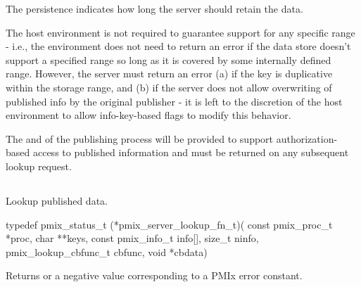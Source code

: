 The persistence indicates how long the server should retain the data.

\advicermstart
The host environment is not required to guarantee support for any specific range - i.e., the environment does not need to return an error if the data store doesn't support a specified range so long as it is covered by some internally defined range.
However, the server must return an error (a) if the key is duplicative within the storage range, and (b) if the server does not allow overwriting of published info by the original publisher - it is left to the discretion of the host environment to allow info-key-based flags to modify this behavior.

The  and  of the publishing process will be provided to support authorization-based access to published information and must be returned on any subsequent lookup request.
\advicermend

\subsection{}

\summary

Lookup published data.

\format

\cspecificstart
\begin{codepar}
typedef pmix_status_t (*pmix_server_lookup_fn_t)(
                             const pmix_proc_t *proc,
                             char **keys,
                             const pmix_info_t info[],
                             size_t ninfo,
                             pmix_lookup_cbfunc_t cbfunc,
                             void *cbdata)
\end{codepar}
\cspecificend

\begin{arglist}
\end{arglist}

Returns  or a negative value corresponding to a PMIx error constant.

